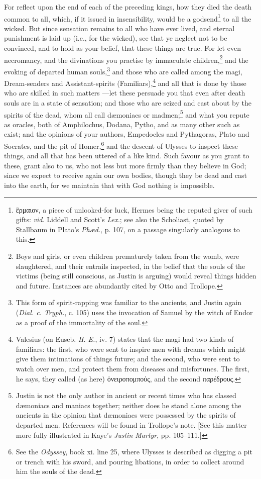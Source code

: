 
For reflect upon the end of each of the preceding kings, how they died the death common to all, which, if it issued in insensibility, would  be a godsend\footnote{\textgreek{ἓρμαιον}, a piece of unlooked-for luck, Hermes being the reputed giver of such gifts: \emph{vid.} Liddell and Scott’s \emph{Lex.}; see also the Scholiast, quoted by Stallbaum in Plato’s \emph{Phæd.}, p. 107, on a passage singularly analogous to this.} to all the wicked. But since sensation remains to all who have ever lived, and eternal punishment is laid up (i.e., for the wicked), see that ye neglect not to be convinced, and to hold as your belief, that these things are true. For let even necromancy, and the divinations you practise by immaculate children,\footnote{Boys and girls, or even children prematurely taken from the womb, were slaughtered, and their entrails inspected, in the belief that the souls of the victims (being still conscious, as Justin is arguing) would reveal things hidden and future. Instances are abundantly cited by Otto and Trollope.} and the evoking of departed human souls,\footnote{This form of spirit-rapping was familiar to the ancients, and Justin again (\emph{Dial. c. Tryph.}, c. 105) uses the invocation of Samuel by the witch of Endor as a proof of the immortality of the soul.} and those who are called among the magi, Dream-senders and Assistant-spirits (Familiars),\footnote{Valesius (on Euseb. \emph{H. E.}, iv. 7) states that the magi had two kinds of familiars: the first, who were sent to inspire men with dreams which might give them intimations of things future; and the second, who were sent to watch over men, and protect them from diseases and misfortunes. The first, he says, they called (as here) \textgreek{ὀνειροπομπούς}, and the second \textgreek{παρέδρους}.} and all that is done by those who are skilled in such matters —let these persuade you that even after death souls are in a state of sensation; and those who are seized and cast about by the spirits of the dead, whom all call dæmoniacs or madmen;\footnote{Justin is not the only author in ancient or recent times who has classed dæmoniacs and maniacs together; neither does he stand alone among the ancients in the opinion that dæmoniacs were possessed by the spirits of departed men. References will be found in Trollope’s note. [See this matter more fully illustrated in Kaye’s \emph{Justin Martyr}, pp. 105–111.]} and what you repute as oracles, both of Amphilochus, Dodana, Pytho, and as many other such as exist; and the opinions of your authors, Empedocles and Pythagoras, Plato and Socrates, and the pit of Homer,\footnote{See the \emph{Odyssey}, book xi. line 25, where Ulysses is described as digging a pit or trench with his sword, and pouring libations, in order to collect around him the souls of the dead.} and the descent of Ulysses to inspect these things, and all that has been uttered of a like kind. Such favour as you grant to these, grant also to us, who not less but more firmly than they believe in God; since we expect to receive again our own bodies, though they be dead and cast into the earth, for we maintain that with God nothing is impossible.

